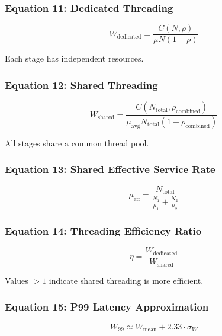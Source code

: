 \documentclass[11pt,a4paper]{article}
\begin{document}
\subsubsection{Equation 11: Dedicated Threading}

\begin{equation}
W_{\text{dedicated}} = \frac{C(N, \rho)}{\mu N (1-\rho)}
\end{equation}

Each stage has independent resources.

\subsubsection{Equation 12: Shared Threading}

\begin{equation}
W_{\text{shared}} = \frac{C(N_{\text{total}}, \rho_{\text{combined}})}{\mu_{\text{avg}} N_{\text{total}} (1-\rho_{\text{combined}})}
\end{equation}

All stages share a common thread pool.

\subsubsection{Equation 13: Shared Effective Service Rate}

\begin{equation}
\mu_{\text{eff}} = \frac{N_{\text{total}}}{\frac{N_1}{\mu_1} + \frac{N_2}{\mu_2}}
\end{equation}

\subsubsection{Equation 14: Threading Efficiency Ratio}

\begin{equation}
\eta = \frac{W_{\text{dedicated}}}{W_{\text{shared}}}
\end{equation}

Values $> 1$ indicate shared threading is more efficient.

\subsubsection{Equation 15: P99 Latency Approximation}

\begin{equation}
W_{99} \approx W_{\text{mean}} + 2.33 \cdot \sigma_W
\end{equation}
\end{document}
